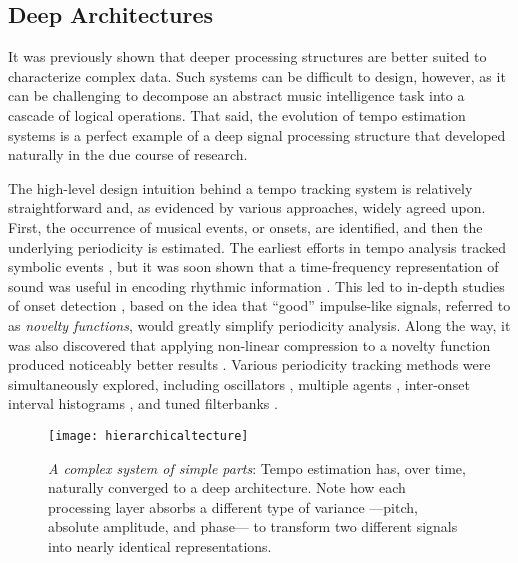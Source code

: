 \subsection{Deep Architectures}
\label{sec:deep_architectures}

It was previously shown that deeper processing structures are better suited to characterize complex data.
Such systems can be difficult to design, however, as it can be challenging to decompose an abstract music intelligence task into a cascade of logical operations.
That said, the evolution of tempo estimation systems is a perfect example of a deep signal processing structure that developed naturally in the due course of research.

The high-level design intuition behind a tempo tracking system is relatively straightforward and, as evidenced by various approaches, widely agreed upon.
First, the occurrence of musical events, or onsets, are identified, and then the underlying periodicity is estimated.
The earliest efforts in tempo analysis tracked symbolic events \cite{Dannenberg1984}, but it was soon shown that a time-frequency representation of sound was useful in encoding rhythmic information \cite{Scheirer1998}.
This led to in-depth studies of onset detection \cite{Bello2005}, based on the idea that ``good'' impulse-like signals, referred to as \emph{novelty functions}, would greatly simplify periodicity analysis.
Along the way, it was also discovered that applying non-linear compression to a novelty function produced noticeably better results \cite{Klapuri2006}.
Various periodicity tracking methods were simultaneously explored, including oscillators \cite{Large1994}, multiple agents \cite{Goto1995}, inter-onset interval histograms \cite{Dixon2007}, and tuned filterbanks \cite{Grosche2011}.

\begin{figure}
\begin{centering}
\texttt{[image: hierarchicaltecture]}
\caption{\emph{A complex system of simple parts}: Tempo estimation has, over time, naturally converged to a deep architecture. Note how each processing layer absorbs a different type of variance ---pitch, absolute amplitude, and phase--- to transform two different signals into nearly identical representations.}
\label{fig:deeparchs}
\end{centering}
\end{figure}

